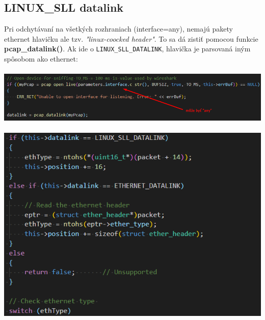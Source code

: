 \documentclass{article}
\begin{document}
        \subsection{LINUX\_SLL datalink}
        Pri odchytávaní na všetkých rozhraniach (interface=any), nemajú pakety ethernet hlavičku ale tzv. \emph{"linux-coocked header"}.
        To sa dá zistiť pomocou funkcie \textbf{pcap\_datalink()}. Ak ide o \texttt{LINUX\_SLL\_DATALINK}, hlavička je parsovaná iným spôsobom ako ethernet:\\\\
        \includegraphics[scale=0.6]{datalink.png}\\\\
        \includegraphics[scale=0.6]{ethernet.png}

        \newpage
\end{document}

